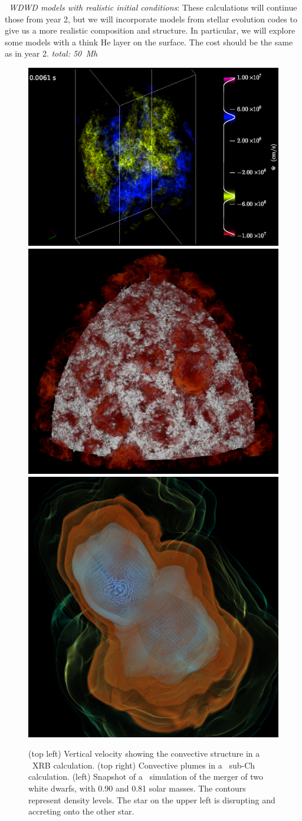 \documentclass[11pt,letterpaper,english]{article}
\begin{document}
\begin{tightitem}
\begin{tightitem}
\item {\em \castro\ WDWD models with realistic initial conditions}:
  These calculations will continue those from year 2, but we will incorporate
  models from stellar evolution codes to give us a more realistic 
  composition and structure.  In particular, we will explore some models
  with a think He layer on the surface.  The cost should be the same
  as in year 2.  {\em total: 50~Mh}

\end{tightitem}
%
\end{tightitem}

\begin{figure}[t]
\centering
\includegraphics[width=0.42\linewidth]{xrb_vol_vz}
\hspace{0.25em}
\includegraphics[width=0.32\linewidth]{ConvPlumes} \\[0.1em]
\includegraphics[width=0.3\linewidth]{generic3plt00180}\hspace{0.5em}
\begin{minipage}[b]{0.44\linewidth}
\caption{\label{fig:current-runs} (top left) Vertical velocity showing the
  convective structure in a \maestro\ XRB calculation.  (top right)
  Convective plumes in a \maestro\ sub-Ch calculation.  (left)
  Snapshot of a \castro\ simulation of the merger of two white dwarfs,
  with 0.90 and 0.81 solar masses. The contours represent density
  levels. The star on the upper left is disrupting and accreting onto
  the other star.}
\end{minipage}
\end{figure}
\end{document}
